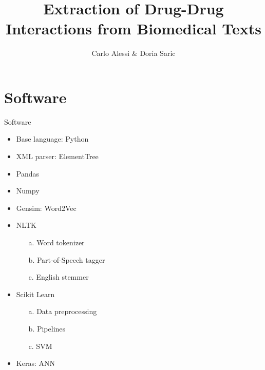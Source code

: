 \documentclass[11pt]{beamer}
\author{Carlo Alessi \& Doria Saric}
\title{Extraction of Drug-Drug Interactions from Biomedical Texts}
\begin{document}

\begin{frame}
\titlepage
\end{frame}


\section{Software}
\begin{frame}{Software}
\begin{itemize}
\item Base language: Python
\item XML parser: ElementTree
\item Pandas
\item Numpy
\item Gensim: Word2Vec
\item NLTK
\begin{itemize}
\item[a.] Word tokenizer
\item[b.] Part-of-Speech tagger
\item[c.] English stemmer
\end{itemize}
\item Scikit Learn
\begin{itemize}
\item[a.] Data preprocessing
\item[b.] Pipelines
\item[c.] SVM
\end{itemize}
\item Keras: ANN
\end{itemize}
\end{frame}
\end{document}
